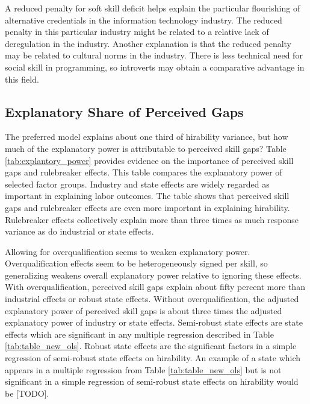 \documentclass[review]{elsarticle}
\begin{document}
A reduced penalty for soft skill deficit helps explain the particular flourishing of alternative credentials in the information technology industry.
The reduced penalty in this particular industry might be related to a relative lack of deregulation in the industry.
Another explanation is that the reduced penalty may be related to cultural norms in the industry.
There is less technical need for social skill in programming, so introverts may obtain a comparative advantage in this field.

\subsection{Explanatory Share of Perceived Gaps}

The preferred model explains about one third of hirability variance, but how much of the explanatory power is attributable to perceived skill gaps?
Table \ref{tab:explantory_power} provides evidence on the importance of perceived skill gaps and rulebreaker effects.
This table compares the explanatory power of selected factor groups.
Industry and state effects are widely regarded as important in explaining labor outcomes.
The table shows that perceived skill gaps and rulebreaker effects are even more important in explaining hirability.
Rulebreaker effects collectively explain more than three times as much response variance as do industrial or state effects.

Allowing for overqualification seems to weaken explanatory power.
Overqualification effects seem to be heterogeneously signed per skill, so generalizing weakens overall explanatory power relative to ignoring these effects.
With overqualification, perceived skill gaps explain about fifty percent more than industrial effects or robust state effects.
Without overqualification, the adjusted explanatory power of perceived skill gaps is about three times the adjusted explanatory power of industry or state effects.
Semi-robust state effects are state effects which are significant in any multiple regression described in Table \ref{tab:table_new_ols}.
Robust state effects are the significant factors in a simple regression of semi-robust state effects on hirability.
An example of a state which appears in a multiple regression from Table \ref{tab:table_new_ols} but is not significant in a simple regression of semi-robust state effects on hirability would be [TODO].
\end{document}
